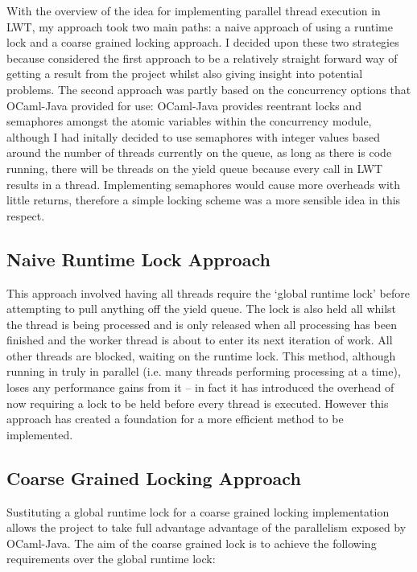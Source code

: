 \documentclass[12pt,twoside,notitlepage]{report}
\begin{document}
With the overview of the idea for implementing parallel thread execution in LWT, my approach took two main paths: a naive approach of using a runtime lock and a coarse grained locking approach. I decided upon these two strategies
because considered the first approach to be a relatively straight forward way of getting a result from the project whilst also giving insight into potential problems. The second approach was partly based on the concurrency options
that OCaml-Java provided for use: OCaml-Java provides reentrant locks and semaphores amongst the atomic variables within the concurrency module, although I had initally decided to use semaphores with integer values based around the
number of threads currently on the queue, as long as there is code running, there will be threads on the yield queue because every call in LWT results in a thread. Implementing semaphores would cause more overheads with little
returns, therefore a simple locking scheme was a more sensible idea in this respect.

\subsection{Naive Runtime Lock Approach}
\label{subsec:naive_runtime_lock_apprach}
%
%
This approach involved having all threads require the `global runtime lock' before attempting to pull anything off the yield queue. The lock is also held all whilst the thread is being processed and is only released when all
processing has been finished and the worker thread is about to enter its next iteration of work. All other threads are blocked, waiting on the runtime lock. This method, although running in truly in parallel (i.e. many threads
performing processing at a time), loses any performance gains from it -- in fact it has introduced the overhead of now requiring a lock to be held before every thread is executed.  However this approach has created a foundation for a
more efficient method to be implemented.
%
%
\subsection{Coarse Grained Locking Approach}
\label{subsec:coarse_grained_locking_apprach}
%
%
Sustituting a global runtime lock for a coarse grained locking implementation allows the project to take full advantage advantage of the parallelism exposed by OCaml-Java. The aim of the coarse grained lock is
to achieve the following requirements over the global runtime lock:
\end{document}
